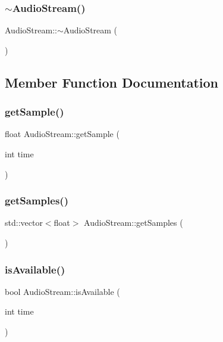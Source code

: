 \mbox{\label{class_audio_stream_a480e5d3468bfe9357dd6c40649b1e449}} 
\subsubsection{$\sim$\+Audio\+Stream()}
{\footnotesize\ttfamily Audio\+Stream\+::$\sim$\+Audio\+Stream (\begin{DoxyParamCaption}{ }\end{DoxyParamCaption})}



\subsection{Member Function Documentation}
\mbox{\label{class_audio_stream_a34fa6ead0ccde4cbe9db7435b3c1fe7a}} 
\subsubsection{get\+Sample()}
{\footnotesize\ttfamily float Audio\+Stream\+::get\+Sample (\begin{DoxyParamCaption}\item[{int}]{time }\end{DoxyParamCaption})}

\mbox{\label{class_audio_stream_ae540add8cdf33421e2e3f9014cfa8c52}} 
\subsubsection{get\+Samples()}
{\footnotesize\ttfamily std\+::vector$<$float$>$ Audio\+Stream\+::get\+Samples (\begin{DoxyParamCaption}{ }\end{DoxyParamCaption})}

\mbox{\label{class_audio_stream_ac129ca09a55aaeb905bb73ff9440b8ae}} 
\subsubsection{is\+Available()}
{\footnotesize\ttfamily bool Audio\+Stream\+::is\+Available (\begin{DoxyParamCaption}\item[{int}]{time }\end{DoxyParamCaption})}

